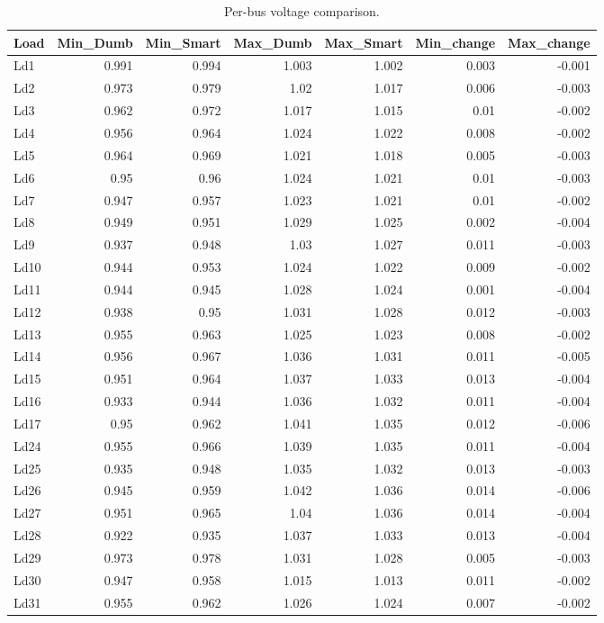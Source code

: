 \begin{table}[h]
\centering
\caption{Per-bus voltage comparison.}
\label{tab:per-bus-voltage}
\begin{tabular}{lrrrrrr}
\toprule
Load & Min_Dumb & Min_Smart & Max_Dumb & Max_Smart & Min_change & Max_change \\
\midrule
Ld1 & 0.991 & 0.994 & 1.003 & 1.002 & 0.003 & -0.001 \\
Ld2 & 0.973 & 0.979 & 1.02 & 1.017 & 0.006 & -0.003 \\
Ld3 & 0.962 & 0.972 & 1.017 & 1.015 & 0.01 & -0.002 \\
Ld4 & 0.956 & 0.964 & 1.024 & 1.022 & 0.008 & -0.002 \\
Ld5 & 0.964 & 0.969 & 1.021 & 1.018 & 0.005 & -0.003 \\
Ld6 & 0.95 & 0.96 & 1.024 & 1.021 & 0.01 & -0.003 \\
Ld7 & 0.947 & 0.957 & 1.023 & 1.021 & 0.01 & -0.002 \\
Ld8 & 0.949 & 0.951 & 1.029 & 1.025 & 0.002 & -0.004 \\
Ld9 & 0.937 & 0.948 & 1.03 & 1.027 & 0.011 & -0.003 \\
Ld10 & 0.944 & 0.953 & 1.024 & 1.022 & 0.009 & -0.002 \\
Ld11 & 0.944 & 0.945 & 1.028 & 1.024 & 0.001 & -0.004 \\
Ld12 & 0.938 & 0.95 & 1.031 & 1.028 & 0.012 & -0.003 \\
Ld13 & 0.955 & 0.963 & 1.025 & 1.023 & 0.008 & -0.002 \\
Ld14 & 0.956 & 0.967 & 1.036 & 1.031 & 0.011 & -0.005 \\
Ld15 & 0.951 & 0.964 & 1.037 & 1.033 & 0.013 & -0.004 \\
Ld16 & 0.933 & 0.944 & 1.036 & 1.032 & 0.011 & -0.004 \\
Ld17 & 0.95 & 0.962 & 1.041 & 1.035 & 0.012 & -0.006 \\
Ld24 & 0.955 & 0.966 & 1.039 & 1.035 & 0.011 & -0.004 \\
Ld25 & 0.935 & 0.948 & 1.035 & 1.032 & 0.013 & -0.003 \\
Ld26 & 0.945 & 0.959 & 1.042 & 1.036 & 0.014 & -0.006 \\
Ld27 & 0.951 & 0.965 & 1.04 & 1.036 & 0.014 & -0.004 \\
Ld28 & 0.922 & 0.935 & 1.037 & 1.033 & 0.013 & -0.004 \\
Ld29 & 0.973 & 0.978 & 1.031 & 1.028 & 0.005 & -0.003 \\
Ld30 & 0.947 & 0.958 & 1.015 & 1.013 & 0.011 & -0.002 \\
Ld31 & 0.955 & 0.962 & 1.026 & 1.024 & 0.007 & -0.002 \\
\bottomrule
\end{tabular}
\end{table}
